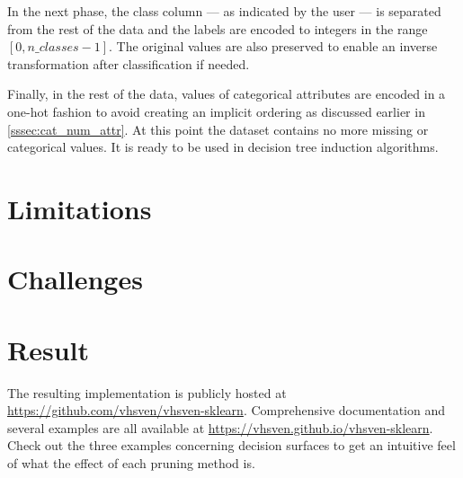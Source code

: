 In the next phase, the class column --- as indicated by the user --- is separated from the rest of the data and the labels are encoded to integers in the range $[0, n\_classes - 1]$. The original values are also preserved to enable an inverse transformation after classification if needed. 

Finally, in the rest of the data, values of categorical attributes are encoded in a one-hot fashion to avoid creating an implicit ordering as discussed earlier in \autoref{sssec:cat_num_attr}. At this point the dataset contains no more missing or categorical values. It is ready to be used in decision tree induction algorithms.


\section{Limitations}

\section{Challenges}

\section{Result}
The resulting implementation is publicly hosted at \url{https://github.com/vhsven/vhsven-sklearn}. Comprehensive documentation and several examples are all available at \url{https://vhsven.github.io/vhsven-sklearn}. Check out the three examples concerning decision surfaces to get an intuitive feel of what the effect of each pruning method is.


